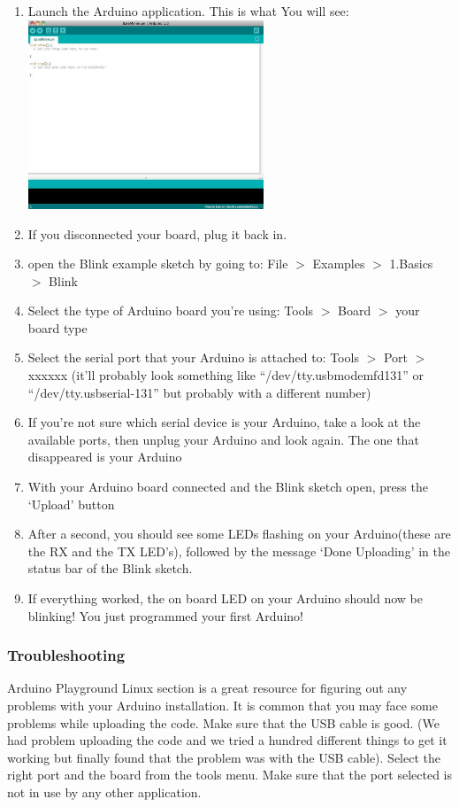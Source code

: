 \documentclass[a4paper,12pt]{article}
\begin{document}
\begin{enumerate}
	\item Launch the Arduino application. This is what You will see:
	\newline 
	\\
	\includegraphics[width=200pt]{IDE}
	\item If you disconnected your board, plug it back in.
	\item open the Blink example sketch by going to: File $>$ Examples $>$ 1.Basics $>$ Blink
	\item Select the type of Arduino board you're using: Tools $>$ Board $>$ your board type
	\item Select the serial port that your Arduino is attached to: Tools $>$ Port $>$
xxxxxx (it’ll probably look something like “/dev/tty.usbmodemfd131” or “/dev/tty.usbserial-131” but probably with a different number) 
	\item	If you’re not sure which serial device is your Arduino, take a look at the available ports, then unplug your Arduino and look again. The one that disappeared is your Arduino
	\item With your Arduino board connected and the Blink sketch open, press the `Upload' button
	\item After a second, you should see some LEDs flashing on your Arduino(these are the RX and the TX LED's), followed by
the message `Done Uploading' in the status bar of the Blink sketch.
	\item If everything worked, the on board LED on your Arduino should now be blinking! You just programmed your first Arduino!
\end{enumerate}

\subsubsection*{Troubleshooting}
Arduino Playground Linux section is a great resource for figuring out any problems with your Arduino installation. It is common that
you may face some problems while uploading the code. Make sure that the USB cable is good. (We had problem uploading the code and we
tried a hundred different things to get it working but finally found that the problem was with the USB cable). Select the right port and 
the board from the tools menu. Make sure that the port selected is not in use by any other application.
\end{document}
